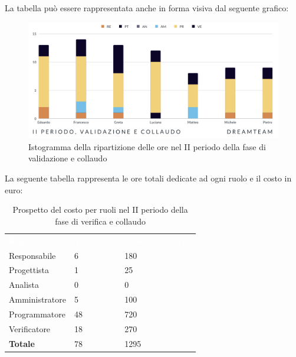 La tabella può essere rappresentata anche in forma visiva dal seguente grafico:
\begin{figure}[!h]
\centering
\includegraphics[scale=0.65]{Sezioni/SezioniPreventivo/grafici/Validazione_collaudo_II_periodo.png}
\caption{Istogramma della ripartizione delle ore nel II periodo della fase di validazione e collaudo}
\end{figure}

La seguente tabella rappresenta le ore totali dedicate ad ogni ruolo e il costo in euro:

\begin{table}[!htbp]
\begin{center}
\renewcommand{\arraystretch}{1.5}
\begin{tabular}{ m{}<{\centering}  m{}<{\centering} m{}<{\centering}}
	\rowcolor{darkblue}
	\textcolor{white}{\textbf{Ruolo}}&\textcolor{white}{\textbf{Totale ore}}&\textcolor{white}{\textbf{Costo totale (\euro)}}\\ 

	Responsabile  & 6 & 180 \\	
	
	Progettista & 1 & 25 \\
	
	Analista & 0 & 0 \\

	Amministratore & 5 & 100 \\
	
	Programmatore & 48 & 720 \\
	
	Verificatore & 18 & 270 \\
	
	\textbf{Totale} & 78 & 1295 \\
	
\end{tabular}
\caption{Prospetto del costo per ruoli nel II periodo della fase di verifica e collaudo}
\end{center}
\end{table}

